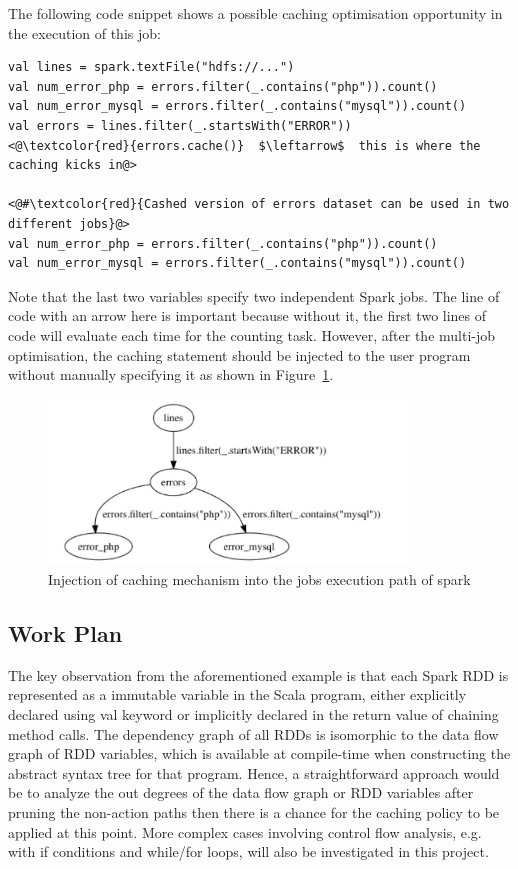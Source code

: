\documentclass[11.5pt]{article}
\begin{document}
The following code snippet shows a possible caching optimisation opportunity in the execution of this job:

\begin{lstlisting}[frame=single, caption=Possible Caching Example, label=code:example]
val lines = spark.textFile("hdfs://...")
val num_error_php = errors.filter(_.contains("php")).count()
val num_error_mysql = errors.filter(_.contains("mysql")).count()
val errors = lines.filter(_.startsWith("ERROR"))
<@\textcolor{red}{errors.cache()}  $\leftarrow$  this is where the caching kicks in@>

<@#\textcolor{red}{Cashed version of errors dataset can be used in two different jobs}@>
val num_error_php = errors.filter(_.contains("php")).count()
val num_error_mysql = errors.filter(_.contains("mysql")).count()
\end{lstlisting} 

Note that the last two variables specify two independent Spark jobs. The line of code with an arrow here is important because without it, the first two lines of code will evaluate each time for the counting task. However, after the multi-job optimisation, the caching statement should be injected to the user program without manually specifying it as shown in Figure~\ref{fig:example}. 

\begin{figure}[htbp]
	\centering	 
		\includegraphics[width=0.85\textwidth]{images/1.JPEG}
	\caption{Injection of caching mechanism into the jobs execution path of spark}
	\label{fig:example}
\end{figure}

\subsection{Work Plan}
The key observation from the aforementioned example is that each Spark RDD is represented as a immutable variable in the Scala program, either explicitly declared using val keyword or implicitly declared in the return value of chaining method calls. The dependency graph of all RDDs is isomorphic to the data flow graph of RDD variables, which is available at compile-time when constructing the abstract syntax tree for that program. Hence, a straightforward approach would be to analyze the out degrees of the data flow graph or RDD variables after pruning the non-action paths then there is a chance for the caching policy to be applied at this point. More complex cases involving control flow analysis, e.g. with if conditions and while/for loops, will also be investigated in this project.
\end{document}
